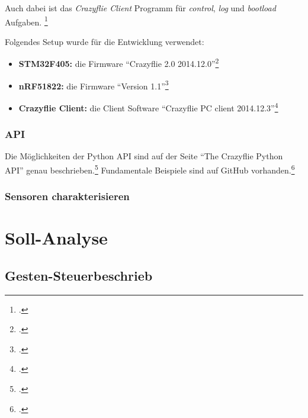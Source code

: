 Auch dabei ist das \textit{Crazyflie Client} Programm für \textit{control}, \textit{log} und \textit{bootload} Aufgaben.
\footcite{doc_crazyflie_client_pycfclient_index_Bitcraze_Wiki_2015-03-30}

Folgendes Setup wurde für die Entwicklung verwendet:
\begin{itemize}
	\item \textbf{STM32F405:} die Firmware "`Crazyflie 2.0 2014.12.0"'\footcite{bitcraze_crazyflie-firmware_2015-03-30}
	\item \textbf{nRF51822:} die Firmware "`Version 1.1"'\footcite{bitcraze_crazyflie2-nrf-firmware_2015-03-30}
	\item \textbf{Crazyflie Client:} die Client Software "`Crazyflie PC client 2014.12.3"'\footcite{bitcraze_crazyflie-clients-python_2015-03-30}
\end{itemize}


\subsubsection{API}
Die Möglichkeiten der Python API sind auf der Seite "`The Crazyflie Python API"' genau beschrieben.\footcite{doc_crazyflie_api_python_index_Bitcraze_Wiki_2015-03-30}
Fundamentale Beispiele sind auf GitHub vorhanden.\footcite{crazyflie-clients-python_examples_crazyflie-clients-python_2015-03-30}


\subsubsection{Sensoren charakterisieren}



\section{Soll-Analyse}
\subsection{Gesten-Steuerbeschrieb}



